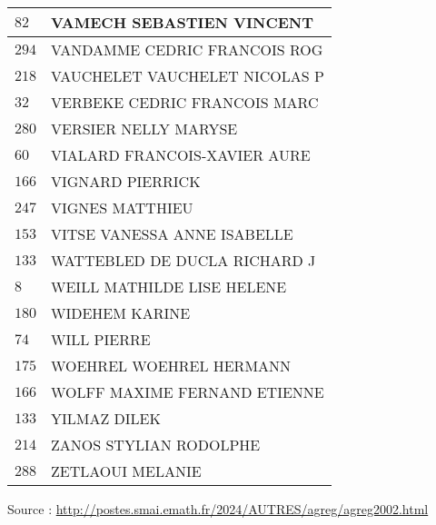 \begin{xltabular}{\linewidth}{|l|X|}
    \hline
    $82$ & VAMECH SEBASTIEN VINCENT \\
    \hline
    $294$ & VANDAMME CEDRIC FRANCOIS ROG \\
    \hline
    $218$ & VAUCHELET VAUCHELET NICOLAS P \\
    \hline
    $32$ & VERBEKE CEDRIC FRANCOIS MARC \\
    \hline
    $280$ & VERSIER NELLY MARYSE \\
    \hline
    $60$ & VIALARD FRANCOIS-XAVIER AURE \\
    \hline
    $166$ & VIGNARD PIERRICK \\
    \hline
    $247$ & VIGNES MATTHIEU \\
    \hline
    $153$ & VITSE VANESSA ANNE ISABELLE \\
    \hline
    $133$ & WATTEBLED DE DUCLA RICHARD J \\
    \hline
    $8$ & WEILL MATHILDE LISE HELENE \\
    \hline
    $180$ & WIDEHEM KARINE \\
    \hline
    $74$ & WILL PIERRE \\
    \hline
    $175$ & WOEHREL WOEHREL HERMANN \\
    \hline
    $166$ & WOLFF MAXIME FERNAND ETIENNE \\
    \hline
    $133$ & YILMAZ DILEK \\
    \hline
    $214$ & ZANOS STYLIAN RODOLPHE \\
    \hline
    $288$ & ZETLAOUI MELANIE \\
    \hline
  \end{xltabular}

  \begin{flushright}
    {\tiny Source : \url{http://postes.smai.emath.fr/2024/AUTRES/agreg/agreg2002.html}}
  \end{flushright}

